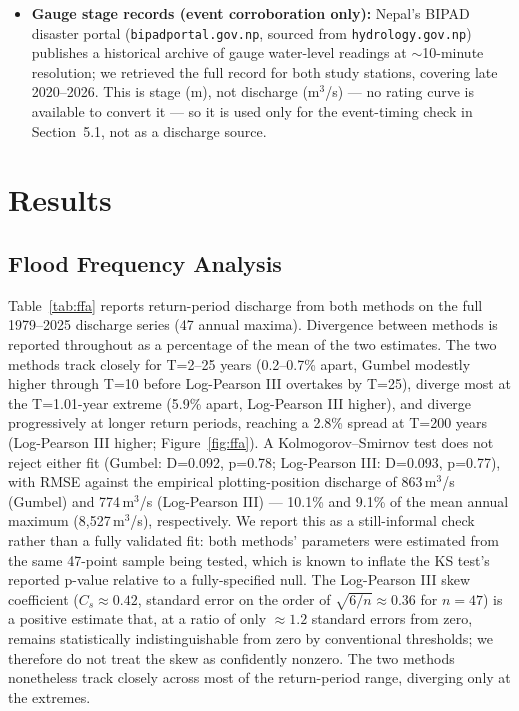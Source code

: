\documentclass[11pt]{article}
\begin{document}
\begin{itemize}
\item \textbf{Gauge stage records (event corroboration only):} Nepal's BIPAD disaster portal \citep{bipad2026} (\texttt{bipadportal.gov.np}, sourced from \texttt{hydrology.gov.np}) publishes a historical archive of gauge water-level readings at ${\sim}$10-minute resolution; we retrieved the full record for both study stations, covering late 2020--2026. This is stage (m), not discharge (m$^3$/s) --- no rating curve is available to convert it --- so it is used only for the event-timing check in Section~5.1, not as a discharge source.
\end{itemize}

\section{Results}

\subsection{Flood Frequency Analysis}
Table~\ref{tab:ffa} reports return-period discharge from both methods on the full 1979--2025 discharge series (47 annual maxima). Divergence between methods is reported throughout as a percentage of the mean of the two estimates. The two methods track closely for T=2--25 years (0.2--0.7\% apart, Gumbel modestly higher through T=10 before Log-Pearson III overtakes by T=25), diverge most at the T=1.01-year extreme (5.9\% apart, Log-Pearson III higher), and diverge progressively at longer return periods, reaching a 2.8\% spread at T=200 years (Log-Pearson III higher; Figure~\ref{fig:ffa}). A Kolmogorov--Smirnov test does not reject either fit (Gumbel: D=0.092, p=0.78; Log-Pearson III: D=0.093, p=0.77), with RMSE against the empirical plotting-position discharge of 863\,m$^3$/s (Gumbel) and 774\,m$^3$/s (Log-Pearson III) --- 10.1\% and 9.1\% of the mean annual maximum (8,527\,m$^3$/s), respectively. We report this as a still-informal check rather than a fully validated fit: both methods' parameters were estimated from the same 47-point sample being tested, which is known to inflate the KS test's reported p-value relative to a fully-specified null. The Log-Pearson III skew coefficient ($C_s\approx0.42$, standard error on the order of $\sqrt{6/n}\approx0.36$ for $n=47$) is a positive estimate that, at a ratio of only ${\approx}1.2$ standard errors from zero, remains statistically indistinguishable from zero by conventional thresholds; we therefore do not treat the skew as confidently nonzero. The two methods nonetheless track closely across most of the return-period range, diverging only at the extremes.
\end{document}
